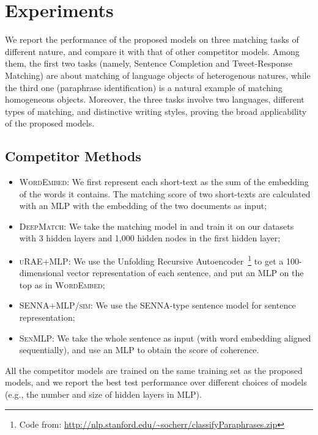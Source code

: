 \documentclass{article} \usepackage{nips14submit_e,times}
\newcommand{\0}{\ensuremath{\mathbf{0}}}
\newcommand{\1}{\ensuremath{\mathbf{1}}}
\begin{document}
\section{Experiments} \label{s:expts} \vspace{-10pt}
We report the performance of the proposed models on three matching tasks of different nature, and compare it with that of other competitor models. Among them, the first two tasks (namely, Sentence Completion and Tweet-Response Matching) are about matching of language objects of heterogenous natures, while the third one (paraphrase identification) is a natural example of matching homogeneous objects. Moreover, the three tasks involve two languages, different types of matching, and distinctive writing styles, proving the broad applicability of the proposed models. \vspace{-10pt}
\subsection{Competitor Methods}
\begin{itemize}
\item \textsc{WordEmbed:} We first represent each short-text as the sum of the embedding of the words it contains. The matching score of two short-texts are calculated with an MLP with the embedding of the two documents as input; \vspace{-3pt}
\item \textsc{DeepMatch:} We take the matching model in \cite{nipsmatch} and train it on our datasets with 3 hidden layers and 1,000 hidden nodes in the first hidden layer; \vspace{-3pt}
\item \textsc{uRAE+MLP:} We use the Unfolding Recursive Autoencoder~\cite{socher2011}\footnote{Code from: \url{http://nlp.stanford.edu/~socherr/classifyParaphrases.zip}} to get a 100-dimensional vector representation of each sentence, and put an MLP on the top as in \textsc{WordEmbed}; \vspace{-3pt}
\item \textsc{SENNA+MLP/sim:} We use the SENNA-type sentence model for sentence representation;\vspace{-3pt}
\item \textsc{SenMLP:} We take the whole sentence as input (with word embedding aligned sequentially), and use an MLP to obtain the score of coherence. \vspace{-3pt}
\end{itemize}
All the competitor models are trained on the same training set as the proposed models, and we report the best test performance over different choices of models (e.g., the number and size of hidden layers in MLP).
\end{document}
